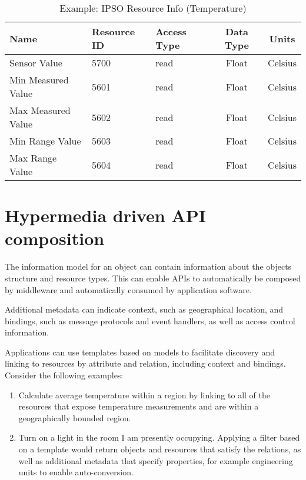 \documentclass[journal]{IEEEtran}
\begin{document}
\begin{table}[htdp]
\caption{Example: IPSO Resource Info (Temperature)}
\begin{center}
\begin{tabular}{|p{2cm}|p{1cm}|p{1cm}|c|c|}
\hline
\textbf{Name} & \textbf{Resource ID} & \textbf{Access Type} & \textbf{Data Type} & \textbf{Units} \\
\hline\hline
Sensor Value & 5700 & read & Float & Celsius\\ 
\hline
Min Measured Value & 5601 & read & Float & Celsius \\
\hline
Max Measured Value & 5602 & read & Float & Celsius \\
\hline 
Min Range Value & 5603 & read & Float & Celsius \\
\hline
Max Range Value & 5604 & read & Float & Celsius \\
\hline 
\end{tabular}
\end{center}
\label{ipso-temperature-resource}
\end{table}


\section{Hypermedia driven API composition}
The information model for an object can contain information about the objects structure and resource types. This can enable APIs to automatically be composed by middleware and automatically consumed by application software. 

Additional metadata can indicate context, such as geographical location, and bindings, such as message protocols and event handlers, as well as access control information.

Applications can use templates based on models to facilitate discovery and linking to resources by attribute and relation, including context and bindings. Consider the following examples: 
\begin{enumerate}
  \item Calculate average temperature within a region by linking to all of the resources that expose temperature measurements and are within a geographically bounded region.
  \item Turn on a light in the room I am presently occupying. Applying a filter based on a template would return objects and resources that satisfy the relations, as well as additional metadata that specify properties, for example engineering units to enable auto-conversion.
\end{enumerate} 
\end{document}
